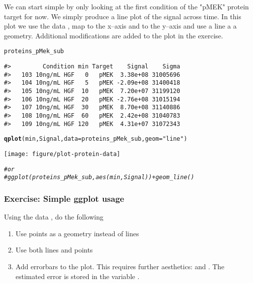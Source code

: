 \documentclass{article}\usepackage[]{graphicx}\usepackage[usenames,dvipsnames]{color}
\makeatletter
\def\maxwidth{ %
  \ifdim\Gin@nat@width>\linewidth
    \linewidth
  \else
    \Gin@nat@width
  \fi
}
\newcommand{\hlstr}[1]{\textcolor[rgb]{0.192,0.494,0.8}{#1}}%
\newcommand{\hlcom}[1]{\textcolor[rgb]{0.678,0.584,0.686}{\textit{#1}}}%
\newcommand{\hlstd}[1]{\textcolor[rgb]{0.345,0.345,0.345}{#1}}%
\newcommand{\hlkwc}[1]{\textcolor[rgb]{0.333,0.667,0.333}{#1}}%
\newcommand{\hlkwd}[1]{\textcolor[rgb]{0.737,0.353,0.396}{\textbf{#1}}}%
\newenvironment{kframe}{%
 \def\at@end@of@kframe{}%
 \ifinner\ifhmode%
  \def\at@end@of@kframe{\end{minipage}}%
  \begin{minipage}{\columnwidth}%
 \fi\fi%
 \def\FrameCommand##1{\hskip\@totalleftmargin \hskip-\fboxsep
 \colorbox{shadecolor}{##1}\hskip-\fboxsep
     \hskip-\linewidth \hskip-\@totalleftmargin \hskip\columnwidth}%
 \MakeFramed {\advance\hsize-\width
   \@totalleftmargin\z@ \linewidth\hsize
   \@setminipage}}%
 {\par\unskip\endMakeFramed%
 \at@end@of@kframe}
\newenvironment{knitrout}{}{} %
\makeatother
\begin{document}
We can start simple by only looking at the first condition 
of the "pMEK" protein target for now. We simply
produce a line plot of the signal across time. In this plot
we use the data  ,
 map 
to the x--axis and  to the y--axis and use a 
line a a geometry. Additional modifications are added to the plot
in the exercise.

\begin{knitrout}
\color{fgcolor}\begin{kframe}
\begin{alltt}
\hlstd{proteins_pMek_sub}
\end{alltt}
\begin{verbatim}
#>         Condition min Target    Signal    Sigma
#>   103 10ng/mL HGF   0   pMEK  3.38e+08 31005696
#>   104 10ng/mL HGF   5   pMEK -2.09e+08 31400418
#>   105 10ng/mL HGF  10   pMEK  7.20e+07 31199120
#>   106 10ng/mL HGF  20   pMEK -2.76e+08 31015194
#>   107 10ng/mL HGF  30   pMEK  8.70e+08 31140886
#>   108 10ng/mL HGF  60   pMEK  2.42e+08 31040783
#>   109 10ng/mL HGF 120   pMEK  4.31e+07 31072343
\end{verbatim}
\begin{alltt}
\hlkwd{qplot}\hlstd{(min, Signal,} \hlkwc{data} \hlstd{= proteins_pMek_sub,} \hlkwc{geom} \hlstd{=} \hlstr{"line"}\hlstd{)}
\end{alltt}
\end{kframe}
\texttt{[image: figure/plot-protein-data]} 
\begin{kframe}\begin{alltt}
\hlcom{# or}
\hlcom{#ggplot(proteins_pMek_sub, aes(min, Signal)) + geom_line()}
\end{alltt}
\end{kframe}
\end{knitrout}

\subsubsection*{Exercise: Simple ggplot usage}
 
Using the data , 
do the following

\begin{enumerate}[label=(\emph{\alph*})]

\item Use points as a geometry instead of lines
\item Use both lines and points
\item Add errorbars  to the plot.
This requires  further aesthetics: 
 and . 
The estimated error is stored in the variable .

\end{enumerate}
\end{document}

